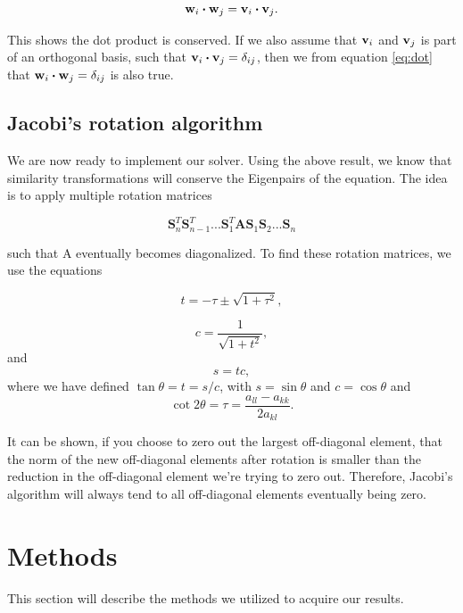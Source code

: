 \documentclass{emulateapj}
\begin{document}
\begin{equation} \label{eq:dot}
	\bold{w}_i \boldsymbol{\cdot} \bold{w}_j = \bold{v}_i \boldsymbol{\cdot} \bold{v}_j.
\end{equation}


This shows the dot product is conserved. If we also assume that $\bold{v}_i$ and $\bold{v}_j$ is part of an orthogonal basis, such that $\bold{v}_i \boldsymbol{\cdot} \bold{v}_j = \delta_{ij}$, then we from equation \ref{eq:dot} that $\bold{w}_i \boldsymbol{\cdot} \bold{w}_j = \delta_{ij}$ is also true.

\subsection{Jacobi's rotation algorithm}
We are now ready to implement our solver. Using the above result, we know that similarity transformations will conserve the Eigenpairs of the equation. The idea is to apply multiple rotation matrices

\[\mathbf{S}_n^T\mathbf{S}_{n-1}^T...\mathbf{S}_1^T\mathbf{A}\mathbf{S}_1\mathbf{S}_2...\mathbf{S}_n\]

such that A eventually becomes diagonalized. To find these rotation matrices, we use the equations

\begin{equation}
  t = -\tau \pm \sqrt{1+\tau^2},
\end{equation}

\begin{equation}
   c = \frac{1}{\sqrt{1+t^2}},
\end{equation}
and
\begin{equation}
    s = tc,
\end{equation}
where we have defined $\tan\theta = t= s/c$, with $s=\sin\theta$ and $c=\cos\theta$ and
\begin{equation*}
    \cot 2\theta=\tau = \frac{a_{ll}-a_{kk}}{2a_{kl}}.
\end{equation*}

It can be shown, if you choose to zero out the largest off-diagonal element, that the norm of the new off-diagonal elements after rotation is smaller than the reduction in the off-diagonal element we're trying to zero out. Therefore, Jacobi's algorithm will always tend to all off-diagonal elements eventually being zero.

\section{Methods}
\label{sec:methods}
This section will describe the methods we utilized to acquire our results.
\end{document}
